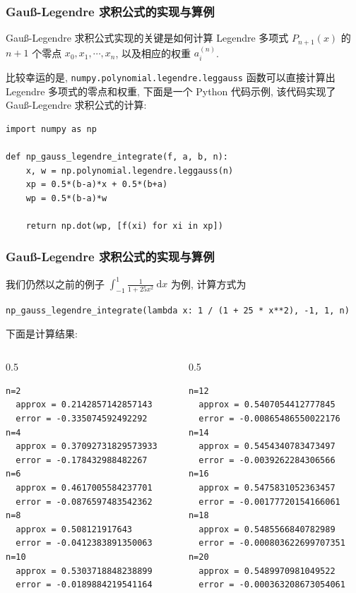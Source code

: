 
\begin{frame}[fragile]
\frametitle{Gauß-Legendre 求积公式的实现与算例}

Gauß-Legendre 求积公式实现的关键是如何计算 Legendre 多项式 $P_{n+1}(x)$ 的 $n+1$ 个零点 $x_0, x_1, \cdots, x_n$, 以及相应的权重 $a_i^{(n)}$.

\pause
\vspace{0.5em}

比较幸运的是, \verb|numpy.polynomial.legendre.leggauss| 函数可以直接计算出 Legendre 多项式的零点和权重, 下面是一个 Python 代码示例, 该代码实现了 Gauß-Legendre 求积公式的计算:

\vspace{0.5em}

\begin{lstlisting}
import numpy as np

def np_gauss_legendre_integrate(f, a, b, n):
    x, w = np.polynomial.legendre.leggauss(n)
    xp = 0.5*(b-a)*x + 0.5*(b+a)
    wp = 0.5*(b-a)*w

    return np.dot(wp, [f(xi) for xi in xp])
\end{lstlisting}

\end{frame}


\begin{frame}[fragile]
\frametitle{Gauß-Legendre 求积公式的实现与算例}

我们仍然以之前的例子 $\int_{-1}^1 \frac{1}{1+ 25x^2} ~ \mathrm{d}x$ 为例, 计算方式为
\begin{center}
\verb|np_gauss_legendre_integrate(lambda x: 1 / (1 + 25 * x**2), -1, 1, n)|
\end{center}
下面是计算结果:

\begin{columns}
\begin{column}{0.5\textwidth}
\begin{lstlisting}[numbers=none,keywordstyle=\color{black}]
n=2
  approx = 0.2142857142857143
  error = -0.335074592492292
n=4
  approx = 0.37092731829573933
  error = -0.178432988482267
n=6
  approx = 0.4617005584237701
  error = -0.0876597483542362
n=8
  approx = 0.508121917643
  error = -0.0412383891350063
n=10
  approx = 0.5303718848238899
  error = -0.0189884219541164
\end{lstlisting}
\end{column}
\begin{column}{0.5\textwidth}
\begin{lstlisting}[numbers=none,keywordstyle=\color{black}]
n=12
  approx = 0.5407054412777845
  error = -0.00865486550022176
n=14
  approx = 0.5454340783473497
  error = -0.0039262284306566
n=16
  approx = 0.5475831052363457
  error = -0.00177720154166061
n=18
  approx = 0.5485566840782989
  error = -0.000803622699707351
n=20
  approx = 0.5489970981049522
  error = -0.000363208673054061
\end{lstlisting}
\end{column}
\end{columns}

\end{frame}

